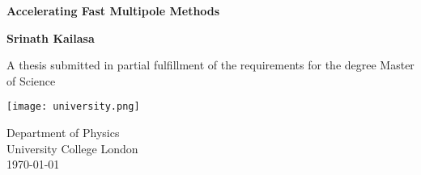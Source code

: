 \begin{titlepage}
    \begin{center}
        \vspace*{1cm}
        
        \Huge
        \textbf{Accelerating Fast Multipole Methods}
        
        \Large
        \vspace{0.5cm}
             
        \vfill
 
        \textbf{Srinath Kailasa}
 
        \vspace{5cm}
             
        A thesis submitted in partial fulfillment of the requirements for the 
        degree Master of Science
             
        \vspace{0.8cm}
      
        \texttt{[image: university.png]}
        
        \large
        Department of Physics\\
        University College London\\
        \today
             
    \end{center}
 \end{titlepage}